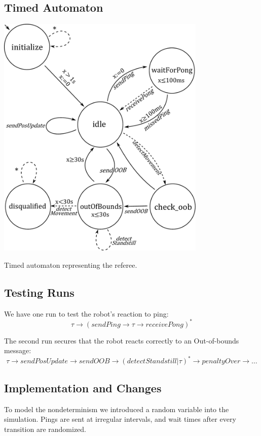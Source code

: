 \documentclass[12pt]{article}
\begin{document}
\subsection*{Timed Automaton}
\begin{center}


\includegraphics[width = 0.75\textwidth]{images/ref_ta.pdf}

Timed automaton representing the referee.

\end{center}

\subsection*{Testing Runs}
We have one run to test the robot's reaction to ping:
\[ \tau \rightarrow (sendPing \rightarrow \tau \rightarrow receivePong)^{*}  \] 

\flushleft
The second run secures that the robot reacts correctly to an Out-of-bounds message:
\[ \tau \rightarrow sendPosUpdate\rightarrow sendOOB \rightarrow (detectStandstill | \tau )^{*} \rightarrow penaltyOver \rightarrow \dots \]

\subsection*{Implementation and Changes}
To model the nondeterminism we introduced a random variable into the simulation. Pings are sent at irregular intervals, and wait times after every transition are randomized.
\end{document}
